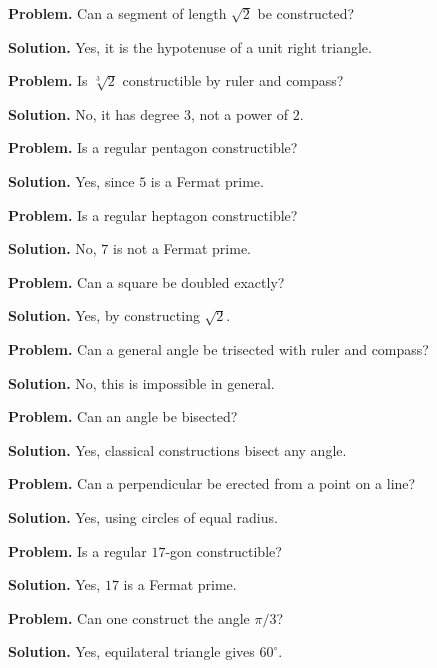 \begin{example}\label{ex:sec12-1}
\textbf{Problem.} Can a segment of length $\sqrt{2}$ be constructed?

\textbf{Solution.} Yes, it is the hypotenuse of a unit right triangle.
\end{example}

\begin{example}\label{ex:sec12-2}
\textbf{Problem.} Is $\sqrt[3]{2}$ constructible by ruler and compass?

\textbf{Solution.} No, it has degree $3$, not a power of $2$.
\end{example}

\begin{example}\label{ex:sec12-3}
\textbf{Problem.} Is a regular pentagon constructible?

\textbf{Solution.} Yes, since $5$ is a Fermat prime.
\end{example}

\begin{example}\label{ex:sec12-4}
\textbf{Problem.} Is a regular heptagon constructible?

\textbf{Solution.} No, $7$ is not a Fermat prime.
\end{example}

\begin{example}\label{ex:sec12-5}
\textbf{Problem.} Can a square be doubled exactly?

\textbf{Solution.} Yes, by constructing $\sqrt{2}$.
\end{example}

\begin{example}\label{ex:sec12-6}
\textbf{Problem.} Can a general angle be trisected with ruler and compass?

\textbf{Solution.} No, this is impossible in general.
\end{example}

\begin{example}\label{ex:sec12-7}
\textbf{Problem.} Can an angle be bisected?

\textbf{Solution.} Yes, classical constructions bisect any angle.
\end{example}

\begin{example}\label{ex:sec12-8}
\textbf{Problem.} Can a perpendicular be erected from a point on a line?

\textbf{Solution.} Yes, using circles of equal radius.
\end{example}

\begin{example}\label{ex:sec12-9}
\textbf{Problem.} Is a regular $17$-gon constructible?

\textbf{Solution.} Yes, $17$ is a Fermat prime.
\end{example}

\begin{example}\label{ex:sec12-10}
\textbf{Problem.} Can one construct the angle $\pi/3$?

\textbf{Solution.} Yes, equilateral triangle gives $60^{\circ}$.
\end{example}
